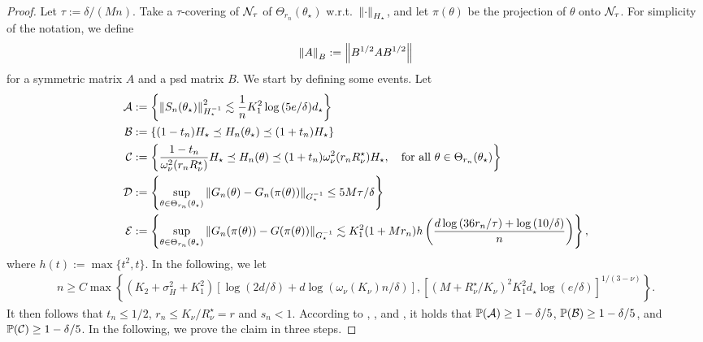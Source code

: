 \begin{proof}
    Let $\tau := \delta / (Mn)$.
    Take a $\tau$-covering of $\mathcal{N}_\tau$ of $\Theta_{r_n}(\theta_\star)$ w.r.t.~$\left\lVert \cdot \right\rVert_{H_\star}$, and let $\pi(\theta)$ be the projection of $\theta$ onto $\mathcal{N}_\tau$.
    For simplicity of the notation, we define
    \begin{align*}
        \left\lVert A \right\rVert_{B} := \left\lVert B^{1/2} A B^{1/2} \right\rVert
    \end{align*}
    for a symmetric matrix $A$ and a psd matrix $B$.
    We start by defining some events.
    Let
    \begin{equation*}
        \begin{split}
            \mathcal{A} &:= \left\{ \left\lVert S_n(\theta_\star) \right\rVert_{H_\star^{-1}}^{2} \lesssim \frac1n K_{1}^2 \log{(5e / \delta)} d_\star \right\} \\
            \mathcal{B} &:= \left\{ (1-t_n) H_\star \preceq H_n(\theta_\star) \preceq (1+t_n) H_\star \right\} \\
            \mathcal{C} &:= \left\{ \frac{1 - t_n}{\omega_\nu^2(r_n R_\nu^\star)} H_\star \preceq H_n(\theta) \preceq (1 + t_n) \omega_\nu^2(r_n R_\nu^\star) H_\star, \quad \mbox{for all } \theta \in \Theta_{r_n}(\theta_\star) \right\} \\
            \mathcal{D} &:= \left\{ \sup_{\theta \in \Theta_{r_n}(\theta_\star)} \left\lVert G_n(\theta) - G_n(\pi(\theta)) \right\rVert_{G_\star^{-1}} \le 5M\tau/\delta \right\} \\
            \mathcal{E} &:= \left\{ \sup_{\theta \in \Theta_{r_n}(\theta_\star)} \left\lVert G_n(\pi(\theta)) - G(\pi(\theta)) \right\rVert_{G_\star^{-1}} \lesssim K_1^2 (1 + Mr_n) h\left( \frac{d\log{(36 r_n/\tau)} + \log{(10/\delta)}}{n} \right) \right\},
        \end{split}
    \end{equation*}
    where $h(t) := \max\{t^2, t\}$.
    In the following, we let
    \begin{align}\label{eq:n_constraint}
        n \ge C \max\left\{ (K_2 + \sigma_H^2 + K_1^2) \left[ \log{(2d/\delta)} + d\log{(\omega_{\nu}(K_\nu) n/\delta)} \right], \left[ (M + R_\nu^\star/K_\nu)^2 K_1^2 d_\star \log{(e/\delta)} \right]^{1/(3-\nu)} \right\}.
    \end{align}
    It then follows that $t_n \le 1/2$, $r_n \le K_\nu / R_\nu^\star = r$ and $s_n < 1$.
    According to , , and , it holds that $\operatorname{\mathbb P}(\mathcal{A}) \ge 1 - \delta/5$, $\operatorname{\mathbb P}(\mathcal{B}) \ge 1 - \delta/5$, and $\operatorname{\mathbb P}(\mathcal{C}) \ge 1 - \delta/5$.
    In the following, we prove the claim in three steps.
    

\end{proof}
